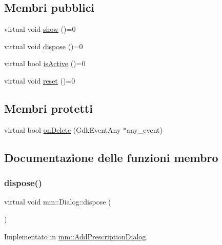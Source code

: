 \subsection*{Membri pubblici}
\begin{DoxyCompactItemize}
\item 
virtual void \mbox{\hyperlink{classmm_1_1_dialog_afda4b0dc7c0ac027c4b8fdb95713700f}{show}} ()=0
\item 
virtual void \mbox{\hyperlink{classmm_1_1_dialog_a3f2e361836af48ee3808f4dd6e4f8e48}{dispose}} ()=0
\item 
virtual bool \mbox{\hyperlink{classmm_1_1_dialog_a22abaf4e90b6fdca5c20039f6b9e15ac}{is\+Active}} ()=0
\item 
virtual void \mbox{\hyperlink{classmm_1_1_dialog_abe6e5ac072c12c06971f60491f079d80}{reset}} ()=0
\end{DoxyCompactItemize}
\subsection*{Membri protetti}
\begin{DoxyCompactItemize}
\item 
virtual bool \mbox{\hyperlink{classmm_1_1_dialog_a9864219c61623b484d8f8c161808e136}{on\+Delete}} (Gdk\+Event\+Any $\ast$any\+\_\+event)
\end{DoxyCompactItemize}


\subsection{Documentazione delle funzioni membro}
\mbox{\label{classmm_1_1_dialog_a3f2e361836af48ee3808f4dd6e4f8e48}} 
\subsubsection{\texorpdfstring{dispose()}{dispose()}}
{\footnotesize\ttfamily virtual void mm\+::\+Dialog\+::dispose (\begin{DoxyParamCaption}{ }\end{DoxyParamCaption})\hspace{0.3cm}{\ttfamily [pure virtual]}}



Implementato in \mbox{\hyperlink{classmm_1_1_add_prescription_dialog_aacb58c7617be2323d91cd5ab2f28e354}{mm\+::\+Add\+Prescription\+Dialog}}.

